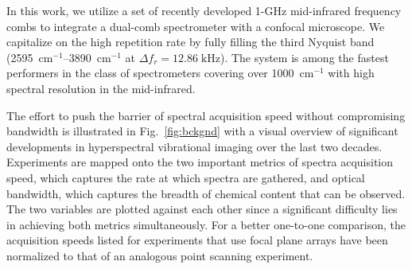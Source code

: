 \documentclass{optica-article}
\begin{document}
In this work, we utilize a set of recently developed 1-GHz mid-infrared frequency combs \cite{hoghooghiBroadband1GHzMidinfrared2022} to integrate a dual-comb spectrometer with a confocal microscope. We capitalize on the high repetition rate by fully filling the third Nyquist band (\mbox{2595 $\mathrm{cm^{-1}}$}--\mbox{3890 $\mathrm{cm^{-1}}$} at \mbox{$\Delta f_r=12.86 \; \text{kHz}$}). The system is among the fastest performers in the class of spectrometers covering over \mbox{1000 $\mathrm{cm^{-1}}$} with high spectral resolution in the mid-infrared.

The effort to push the barrier of spectral acquisition speed without compromising bandwidth is illustrated in \mbox{Fig. \ref{fig:bckgnd}} with a visual overview of significant developments in hyperspectral vibrational imaging over the last two decades. Experiments are mapped onto the two important metrics of spectra acquisition speed, which captures the rate at which spectra are gathered, and optical bandwidth, which captures the breadth of chemical content that can be observed. The two variables are plotted against each other since a significant difficulty lies in achieving both metrics simultaneously. For a better one-to-one comparison, the acquisition speeds listed for experiments that use focal plane arrays have been normalized to that of an analogous point scanning experiment.

\end{document}
